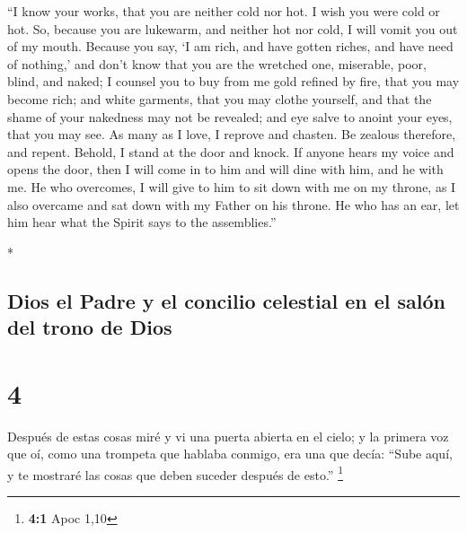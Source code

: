 \begin{paracol}{2}
\begin{otherlanguage}{english}
 ``I know your works, that you are neither cold nor hot.
I wish you were cold or hot.  So, because you are
lukewarm, and neither hot nor cold, I will vomit you out of my mouth.
 Because you say, `I am rich, and have gotten riches, and
have need of nothing,' and don't know that you are the wretched one,
miserable, poor, blind, and naked;  I counsel you to buy
from me gold refined by fire, that you may become rich; and white
garments, that you may clothe yourself, and that the shame of your
nakedness may not be revealed; and eye salve to anoint your eyes, that
you may see.  As many as I love, I reprove and chasten.
Be zealous therefore, and repent.  Behold, I stand at the
door and knock. If anyone hears my voice and opens the door, then I will
come in to him and will dine with him, and he with me. 
He who overcomes, I will give to him to sit down with me on my throne,
as I also overcame and sat down with my Father on his throne.
 He who has an ear, let him hear what the Spirit says to
the assemblies.''

\end{otherlanguage}

\switchcolumn[0]*

\hypertarget{dios-el-padre-y-el-concilio-celestial-en-el-saluxf3n-del-trono-de-dios}{%
\subsection{Dios el Padre y el concilio celestial en el salón del trono
de
Dios}\label{dios-el-padre-y-el-concilio-celestial-en-el-saluxf3n-del-trono-de-dios}}

\hypertarget{section-6}{%
\section{4}\label{section-6}}

 Después de estas cosas miré y vi una puerta abierta en el
cielo; y la primera voz que oí, como una trompeta que hablaba conmigo,
era una que decía: ``Sube aquí, y te mostraré las cosas que deben
suceder después de esto.'' \footnote{\textbf{4:1} Apoc 1,10}


\end{paracol}
